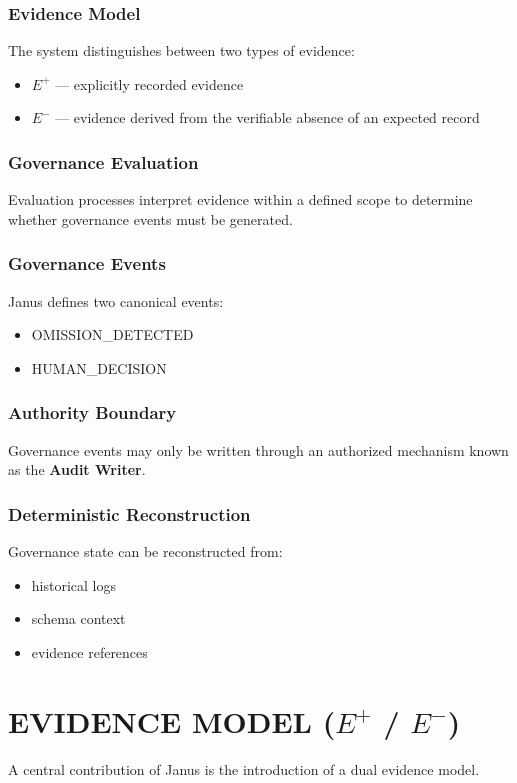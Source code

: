\documentclass[conference]{IEEEtran}
\begin{document}
\subsubsection{Evidence Model}
The system distinguishes between two types of evidence:
\begin{itemize}
  \item \textbf{$E^{+}$} --- explicitly recorded evidence
  \item \textbf{$E^{-}$} --- evidence derived from the verifiable absence of an expected record
\end{itemize}

\subsubsection{Governance Evaluation}
Evaluation processes interpret evidence within a defined scope to determine whether governance events must be generated.

\subsubsection{Governance Events}
Janus defines two canonical events:
\begin{itemize}
  \item OMISSION\_DETECTED
  \item HUMAN\_DECISION
\end{itemize}

\subsubsection{Authority Boundary}
Governance events may only be written through an authorized mechanism known as the \textbf{Audit Writer}.

\subsubsection{Deterministic Reconstruction}
Governance state can be reconstructed from:
\begin{itemize}
  \item historical logs
  \item schema context
  \item evidence references
\end{itemize}

\section{EVIDENCE MODEL ($E^{+}$ / $E^{-}$)}
A central contribution of Janus is the introduction of a dual evidence model.
\end{document}
